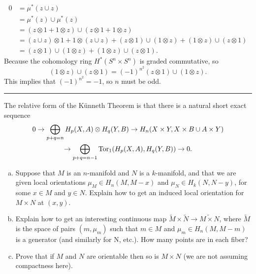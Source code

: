 \documentclass[letterpaper, 12pt]{article}
\begin{document}
\begin{solution}
\begin{enumerate}[(a)]
\begin{align*}
0&=\mu^*(z\cup z)\\
 &=\mu^*(z)\cup\mu^*(z)\\ 
 &=(z\otimes 1+1\otimes z)\cup (z\otimes 1+1\otimes z)\\ 
 &=(z\cup z)\otimes 1+1\otimes (z\cup z)+ (z\otimes 1)\cup (1\otimes z)+(1\otimes z)\cup (z\otimes 1)\\
 &=(z\otimes 1)\cup (1\otimes z)+(1\otimes z)\cup (z\otimes 1).
\end{align*}
Because the cohomology ring \(H^*(S^n\times S^n)\) is graded commutative, so 
\[(1\otimes z)\cup (z\otimes 1)=(-1)^{n^2}(z\otimes 1)\cup (1\otimes z).\]
This implies that \((-1)^{n^2}=-1\), so \(n\) must be odd. 
\end{enumerate}
\end{solution}

\noindent\rule{7in}{2.8pt}
\begin{problem}{5}
The relative form of the Künneth Theorem is that there is a natural short exact sequence 
\begin{multline*}
    0\rightarrow \bigoplus_{p+q=n}H_p(X,A)\otimes H_q(Y,B)\rightarrow H_n(X\times Y, X\times B\cup A\times Y)\\
    \rightarrow \bigoplus_{p+q=n-1}\text{Tor}_1(H_p(X,A),H_q(Y,B))\rightarrow 0.
\end{multline*}

\begin{enumerate}[(a)]
\item Suppose that \(M\) is an \(n\)-manifold and \(N\) is a \(k\)-manifold, and that we are given local orientations \(\mu_M\in H_n(M,M-x)\) and \(\mu_N\in H_k(N,N-y)\), for some \(x\in M\) and \(y\in N\). Explain how to get an induced local orientation for \(M\times N\) at \((x,y)\).
\item Explain how to get an interesting continuous map \(\tilde{M}\times \tilde{N}\rightarrow \widetilde{M\times N}\), where \(\tilde{M}\) is the space of pairs \((m,\mu_m)\) such that \(m\in M\) and \(\mu_m\in H_n(M,M-m)\) is a generator (and similarly for N, etc.). How many points are in each fiber?
\item Prove that if \(M\) and \(N\) are orientable then so is \(M\times N\) (we are not assuming compactness here). 
\end{enumerate}
\end{problem}
\end{document}

